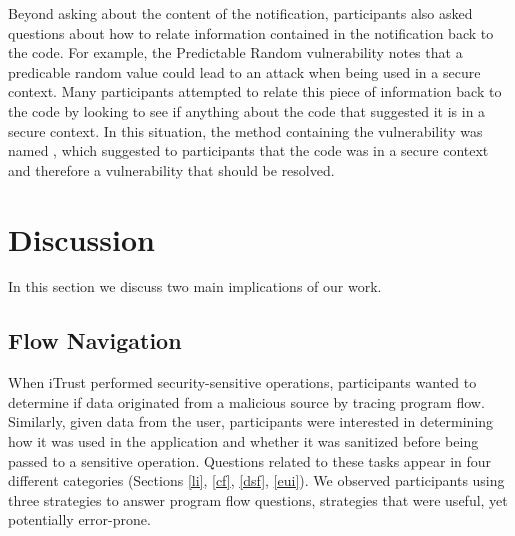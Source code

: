 \documentclass{sig-alternate}
\begin{document}
Beyond asking about the content of the notification, participants also asked questions about how to relate information contained in the notification back to the code. 
For example, the Predictable Random vulnerability notes that a predicable random value could lead to an attack when being used in a secure context. 
Many participants attempted to relate this piece of information back to the code by looking to see if anything about the code that suggested it is in a secure context. 
In this situation, the method containing the vulnerability was named , which suggested to participants that the code was in a secure context and therefore a vulnerability that should be resolved.


\section{Discussion}
In this section we discuss two main implications of our work.

\subsection{Flow Navigation}
\label{flowNav}
When iTrust performed security-sensitive operations, participants wanted to determine if data originated from a malicious source
by tracing program flow.
Similarly, given data from the user, participants were interested in determining how it was used in the application and whether it was sanitized before being passed to a sensitive operation. Questions related to these tasks appear in four different categories (Sections \ref{li}, \ref{cf}, \ref{dsf}, \ref{eui}).
We observed participants using three strategies to answer program flow questions,
strategies that were useful, yet potentially error-prone.
\end{document}
